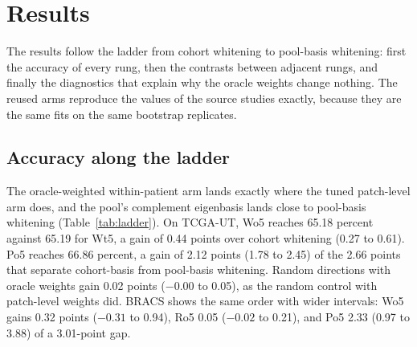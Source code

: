 \section{Results}
\label{sec:results}
The results follow the ladder from cohort whitening to pool-basis whitening: first the accuracy of every rung, then the contrasts between adjacent rungs, and finally the diagnostics that explain why the oracle weights change nothing. The reused arms reproduce the values of the source studies exactly, because they are the same fits on the same bootstrap replicates.

\subsection{Accuracy along the ladder}
\label{sec:ladder-results}
The oracle-weighted within-patient arm lands exactly where the tuned patch-level arm does, and the pool's complement eigenbasis lands close to pool-basis whitening (Table~\ref{tab:ladder}). On TCGA-UT, Wo5 reaches 65.18 percent against 65.19 for Wt5, a gain of 0.44 points over cohort whitening (0.27 to 0.61). Po5 reaches 66.86 percent, a gain of 2.12 points (1.78 to 2.45) of the 2.66 points that separate cohort-basis from pool-basis whitening. Random directions with oracle weights gain 0.02 points ($-0.00$ to 0.05), as the random control with patch-level weights did. BRACS shows the same order with wider intervals: Wo5 gains 0.32 points ($-0.31$ to 0.94), Ro5 0.05 ($-0.02$ to 0.21), and Po5 2.33 (0.97 to 3.88) of a 3.01-point gap.

